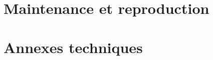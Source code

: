 \documentclass[11pt,oneside]{book}
\begin{document}
\part{Maintenance et reproduction}






\appendix
\part{Annexes techniques}








\end{document}
